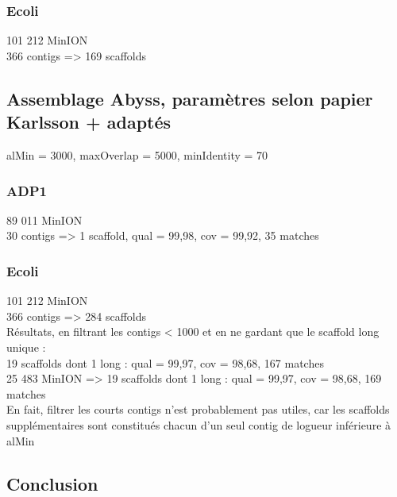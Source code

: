 \documentclass[12pt]{article}
\begin{document}
\subsubsection{Ecoli}

101 212 MinION \\

366 contigs => 169 scaffolds \\

\subsection{Assemblage Abyss, paramètres selon papier Karlsson + adaptés}

alMin = 3000, maxOverlap = 5000, minIdentity = 70

\subsubsection{ADP1}

89 011 MinION \\

30 contigs => 1 scaffold, qual = 99,98, cov = 99,92, 35 matches \\

\subsubsection{Ecoli}

101 212 MinION \\

366 contigs => 284 scaffolds \\

Résultats, en filtrant les contigs < 1000 et en ne gardant que le scaffold long unique : \\

19 scaffolds dont 1 long : qual = 99,97, cov = 98,68, 167 matches \\

25 483 MinION  => 19 scaffolds dont 1 long : qual = 99,97, cov = 98,68, 169 matches \\

En fait, filtrer les courts contigs n'est probablement pas utiles, car les scaffolds supplémentaires sont constitués chacun d'un seul contig de logueur inférieure à alMin

\subsection{Conclusion}
\end{document}
